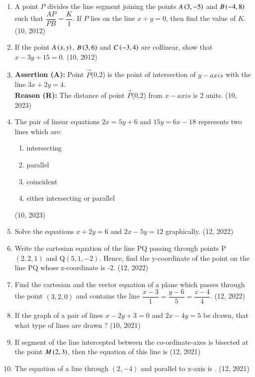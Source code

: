 \begin{enumerate}[label=\thesubsection.\arabic*, ref=\thesubsection.\theenumi]
\item A point $P$ divides the line segment joining the points $A\left(3,-5\right)$ and $B\left(-4,8\right)$ such that $\dfrac{AP}{PB} = \dfrac{K}{1}$. If $P$ lies on the line $x + y = 0$, then find the value of $K$. 
\hfill (10, 2012)
\item If the point $A\left(x,y\right)$, $B\left(3,6\right)$ and $C\left(-3,4\right)$ are collinear, show that $x - 3y + 15 = 0$. 
\hfill (10, 2012)
\item \textbf{Assertion (A):} Point $\vec{P}$(0,2) is the point of intersection of $y-axis$ with  the line $3x+2y=4$.\\
    \textbf{Reason (R):} The distance of point $\vec{P}$(0,2) from $x-axis$ is 2 units. \hfill (10, 2023)
  \item The pair of linear equations $2x=5y+6$ and $15y=6x-18$ represents two lines which are:
      \begin{enumerate}
        \item intersecting
        \item parallel
        \item coincident
        \item either intersecting or parallel
      \end{enumerate} \hfill (10, 2023)
\item Solve the equations $x+2y=6$ and $2x-5y=12$ graphically. \hfill (12, 2022)
\item Write the cartesian equation of the line PQ passing through points P$(2,2,1)$ and Q$(5,1,-2)$. Hence, find the y-coordinate of the point on the line PQ whose z-coordinate is -2. \hfill (12, 2022)
\item Find the cartesian and the vector equation of a plane which passes through the point $(3,2,0)$ and contains the line $\dfrac{x-3}{1}=\dfrac{y-6}{5}=\dfrac{z-4}{4}$. \hfill (12, 2022)
\item If the graph of a pair of lines $ x - 2y + 3 = 0 $ and $ 2x - 4y = 5 $ be drawn, that what type of lines are drawn ? \hfill (10, 2021)
\item If segment of the line intercepted between the co-ordinate-axes is bisected
at the point $M\left(2, 3\right)$, then the equation of this line is
\hfill (12, 2021)
\item The equation of a line through $(2,-4)$ and parallel to x-axis is \underline{\hspace{2cm}}. \hfill (12, 2021)


\end{enumerate}
